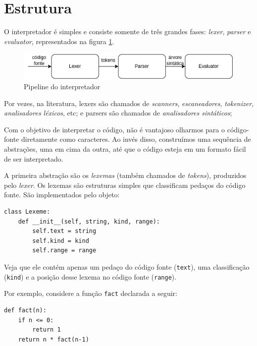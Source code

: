\section{Estrutura}

O interpretador é simples e consiste somente de 
três grandes fases: \textit{lexer}, \textit{parser}
e \textit{evaluator}, representados na figura
\ref{fig:pipeline}.
  

\begin{figure}
    \centering
    \includegraphics[width=0.75\linewidth]{pipeline.png}
    \caption{Pipeline do interpretador}
    \label{fig:pipeline}
\end{figure}

Por vezes, na literatura, lexers são chamados de
\textit{scanners}, \textit{escaneadores},
\textit{tokenizer}, \textit{analisadores léxicos}, etc;
e parsers são chamados de \textit{analisadores sintáticos};
  

Com o objetivo de interpretar o código, não é vantajoso
olharmos para o código-fonte diretamente como caracteres.
Ao invés disso, construímos uma sequência de abstrações,
uma em cima da outra, até que o código esteja em um formato
fácil de ser interpretado.

 
A primeira abstração são os \textit{lexemas} (também chamados
de \textit{tokens}), produzidos pelo
\textit{lexer}. Os lexemas são estruturas simples que
classificam pedaços do código fonte. São implementados
pelo objeto:

\begin{lstlisting}
class Lexeme:
    def __init__(self, string, kind, range):
        self.text = string
        self.kind = kind
        self.range = range
\end{lstlisting}

\noindent Veja que ele contém apenas um pedaço do código fonte
(\verb|text|), uma classificação (\verb|kind|) e
a posição desse lexema no código fonte (\verb|range|).

Por exemplo, considere a função \verb|fact| declarada
a seguir:

\begin{lstlisting}
def fact(n):
    if n <= 0:
        return 1
    return n * fact(n-1)
\end{lstlisting}

